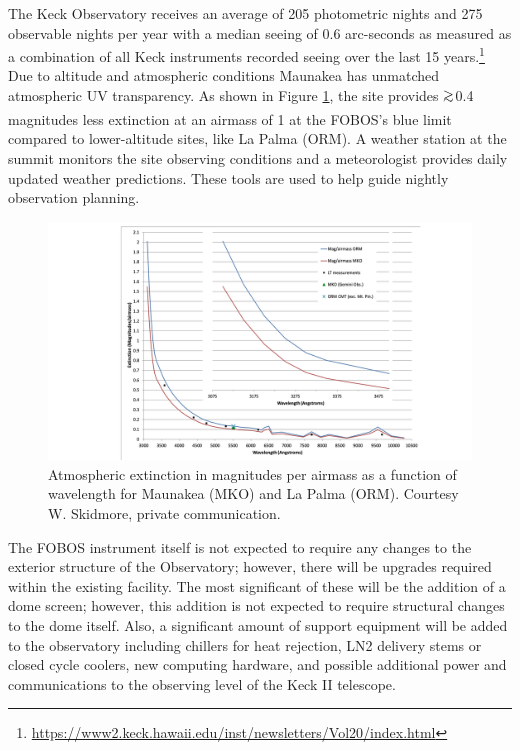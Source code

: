 \documentclass[oneside,11pt]{amsart}
\DeclareRobustCommand{\gtrsim}{%
\mathrel{\hskip-.5em\begin{array}{c}>\\[-8pt]\sim\end{array}\hskip-.5em}}
\begin{document}
The Keck Observatory receives an average of 205 photometric nights
and 275 observable nights per year \citep{Morrison73} with a median
seeing of 0.6 arc-seconds as measured as a combination of all Keck
instruments recorded seeing over the last 15 years.\footnote{
\url{https://www2.keck.hawaii.edu/inst/newsletters/Vol20/index.html}}
Due to altitude and atmospheric conditions Maunakea has unmatched
atmospheric UV transparency. As shown in Figure \ref{fig:keckuv}, the
site provides $\gtrsim$0.4 magnitudes less extinction at an airmass
of 1 at the FOBOS's blue limit compared to lower-altitude sites, like
La Palma (ORM). A weather station at the summit monitors the site
observing conditions and a meteorologist provides daily updated
weather predictions. These tools are used to help guide nightly
observation planning.

\begin{figure}[h!]
\vskip -0.1in
\includegraphics[width=\textwidth]{opticalUVtrans.pdf}
\caption{\small Atmospheric extinction in magnitudes per airmass as a
function of wavelength for Maunakea (MKO) and La Palma (ORM).
Courtesy W. Skidmore, private communication.}
\label{fig:keckuv}
\end{figure}

The FOBOS instrument itself is not expected to require any changes to
the exterior structure of the Observatory; however, there will be
upgrades required within the existing facility. The most significant
of these will be the addition of a dome screen; however, this
addition is not expected to require structural changes to the dome
itself. Also, a significant amount of support equipment will be added
to the observatory including chillers for heat rejection, LN2
delivery stems or closed cycle coolers, new computing hardware, and
possible additional power and communications to the observing level
of the Keck II telescope.
\end{document}
